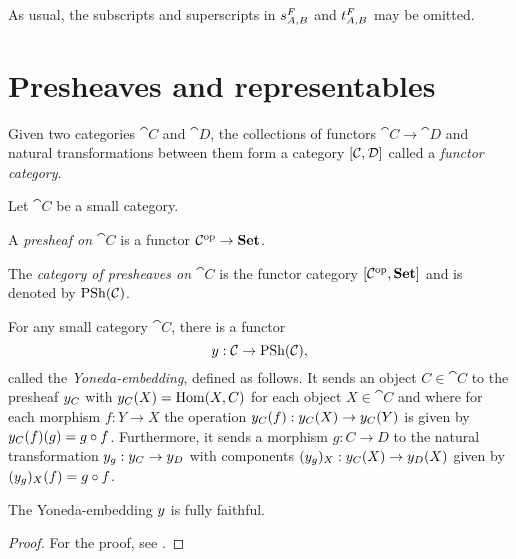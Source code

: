 As usual, the subscripts and superscripts in $\prodcmp[A,B][F]$ and $\expcmp[A,B][F]$ may be omitted.

\section{Presheaves and representables}

Given two categories $\cat{C}$ and $\cat{D}$, the collections of functors $\cat{C} \to \cat{D}$ and natural transformations between them form a category $[\mathcal{C}, \mathcal{D}]$ called a \textit{functor category}.

\begin{defn} \label{def:presheaves}
Let $\cat{C}$ be a small category.
\begin{enum}
\item A \emph{presheaf on $\cat{C}$} is a functor $\mathcal{C}^\mathrm{op} \to \mathbf{Set}$.
\item The \emph{category of presheaves on $\cat{C}$} is the functor category $[\mathcal{C}^\mathrm{op}, \mathbf{Set}]$ and is denoted by $\mathrm{PSh}(\mathcal{C})$.
\end{enum}
\end{defn}


\begin{defn} \label{def:yoneda-embedding}
For any small category $\cat{C}$, there is a functor
\[ y : \mathcal{C} \to \mathrm{PSh}(\mathcal{C}), \]
called the \emph{Yoneda-embedding}, defined as follows. It sends an object $C \in \cat{C}$ to the presheaf $y_{C}$ with $y_{C}(X) = \mathrm{Hom}(X, C)$ for each object $X \in \cat{C}$ and where for each morphism $f : Y \to X$ the operation $y_{C}(f) : y_{C}(X) \to y_{C}(Y)$ is given by $y_{C}(f)(g) = g \circ f$. Furthermore, it sends a morphism $g : C \to D$ to the natural transformation $y_{g} : y_{C} \to y_{D}$ with components $(y_{g})_X : y_{C}(X) \to y_{D}(X)$ given by $(y_{g})_X(f) = g \circ f$.
\end{defn}

\begin{prop} \label{prop:yoneda-is-embedding}
The Yoneda-embedding $y$ is fully faithful.
\begin{proof}
For the proof, see \cite{mac2013categories}.
\end{proof}
\end{prop}

